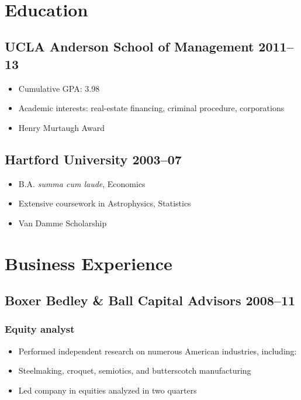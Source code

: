 \documentclass{article}
\begin{document}
	\begin{center}
    {\sffamily\LARGE\bfseries {}} \par\bigskip
		
		\sffamily\footnotesize {} \\ \medskip
		 \par\bigskip
	\end{center}

	\section{Education}
	\subsection{UCLA Anderson School of Management \hfill 2011–13}
	\begin{itemize}
		\item Cumulative GPA: 3.98
		\item Academic interests: real-estate financing, criminal procedure, corporations
		\item Henry Murtaugh Award
	\end{itemize}
	
	\subsection{Hartford University \hfill 2003–07}
	\begin{itemize}
		\item B.A. \textit{summa cum laude}, Economics
		\item Extensive coursework in Astrophysics, Statistics
		\item Van Damme Scholarship
	\end{itemize}
	
\section{Business Experience}
	\subsection{Boxer Bedley \& Ball Capital Advisors \hfill 2008–11}
	\subsubsection{Equity analyst}
	\begin{itemize}
		\item Performed independent research on numerous American industries, including:
		\item Steelmaking, croquet, semiotics, and butterscotch manufacturing
		\item Led company in equities analyzed in two quarters
	\end{itemize}
	
\end{document}
